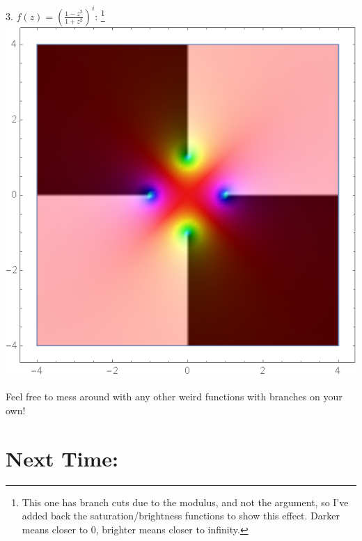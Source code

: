 \documentclass[12pt]{scrartcl}
\begin{document}
\begin{center}
	3. $f(z) = \left(\frac{1-z^2}{1+z^2}\right)^i$: \footnote{This one has branch cuts due to the modulus, and not the argument, so I've added back the saturation/brightness functions to show this effect. Darker means closer to 0, brighter means closer to infinity.}\\
	\includegraphics[scale=0.27]{images/weirdpower.png}
\end{center}
Feel free to mess around with any other weird functions with branches on your own!

\section{Next Time:}
\end{document}
